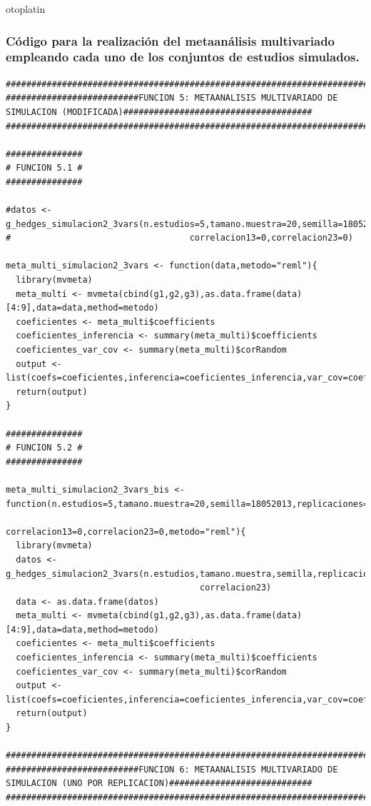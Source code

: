 otoplatin\documentclass[a4paper,openright,12pt]{report}
\begin{document}
\subsubsection{Código para la realización del metaanálisis multivariado empleando cada uno de los conjuntos de estudios simulados.}
{\tiny
\begin{verbatim}
##############################################################################################################################
##########################FUNCION 5: METAANALISIS MULTIVARIADO DE SIMULACION (MODIFICADA)#####################################
##############################################################################################################################

###############
# FUNCION 5.1 #
###############

#datos <- g_hedges_simulacion2_3vars(n.estudios=5,tamano.muestra=20,semilla=18052013,replicaciones=5,correlacion12=0,
#                                   correlacion13=0,correlacion23=0)

meta_multi_simulacion2_3vars <- function(data,metodo="reml"){
  library(mvmeta)
  meta_multi <- mvmeta(cbind(g1,g2,g3),as.data.frame(data)[4:9],data=data,method=metodo)
  coeficientes <- meta_multi$coefficients
  coeficientes_inferencia <- summary(meta_multi)$coefficients
  coeficientes_var_cov <- summary(meta_multi)$corRandom
  output <- list(coefs=coeficientes,inferencia=coeficientes_inferencia,var_cov=coeficientes_var_cov)
  return(output)
}

###############
# FUNCION 5.2 #
###############

meta_multi_simulacion2_3vars_bis <- function(n.estudios=5,tamano.muestra=20,semilla=18052013,replicaciones=5,correlacion12=0,
                                             correlacion13=0,correlacion23=0,metodo="reml"){
  library(mvmeta)
  datos <- g_hedges_simulacion2_3vars(n.estudios,tamano.muestra,semilla,replicaciones,correlacion12,correlacion13,
                                      correlacion23)
  data <- as.data.frame(datos)
  meta_multi <- mvmeta(cbind(g1,g2,g3),as.data.frame(data)[4:9],data=data,method=metodo)
  coeficientes <- meta_multi$coefficients
  coeficientes_inferencia <- summary(meta_multi)$coefficients
  coeficientes_var_cov <- summary(meta_multi)$corRandom
  output <- list(coefs=coeficientes,inferencia=coeficientes_inferencia,var_cov=coeficientes_var_cov)
  return(output)  
}

##############################################################################################################################
##########################FUNCION 6: METAANALISIS MULTIVARIADO DE SIMULACION (UNO POR REPLICACION)############################
##############################################################################################################################


\end{verbatim}}
\end{document}

